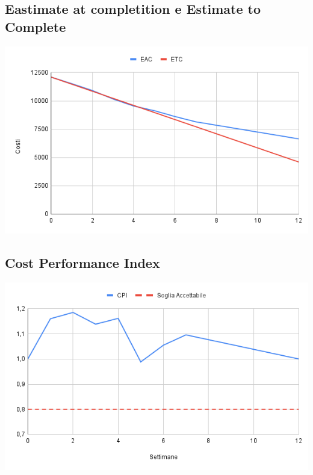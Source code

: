 \documentclass[a4paper, 12pt]{article}
\begin{document}
\subsection*{Eastimate at completition e Estimate to Complete}
\begin{center}
	\includegraphics[scale=0.6]{EAC_ETC.png}
\end{center}
\subsection{Cost Performance Index}
\begin{center}
	\includegraphics[scale=0.6]{CPI.png}
\end{center}
\end{document}
